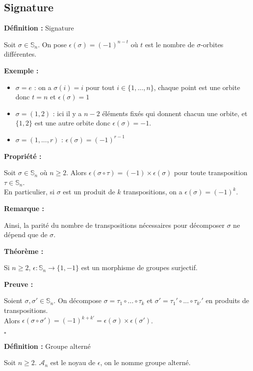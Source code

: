 \documentclass{report}
\renewenvironment{leftbar}{%
  \def\FrameCommand{\vrule width 0.4pt \hspace{10pt}}%
  \MakeFramed {\advance\hsize-\width \FrameRestore}}%
 {\endMakeFramed}%
\newenvironment{definition}[1][]{
    \begin{tcolorbox}[colframe= white]
    \textbf{Définition :} 
    #1 \par
    }
    {\end{tcolorbox}}
\newenvironment{preuve}{\vspace*{0.5cm}
    \begin{leftbar}
    \noindent\textbf{Preuve :}\par}{
    \begin{flushright}
    $\square$
    \end{flushright}
    \end{leftbar}
}
\newenvironment{prop}{\begin{tcolorbox}[colframe= white]
    \textbf{Propriété :}
     \par}
    {\end{tcolorbox}}
\newenvironment{exemple}{\begin{tcolorbox}[colback=gray!10,colframe= white]
    \textbf{Exemple :}
     \par}
    {\end{tcolorbox}}
\newenvironment{theoreme}[1][]{
    \begin{tcolorbox}[]
    \textbf{Théorème :} #1  \par} 
    {\end{tcolorbox}}
\newcommand{\remarque}{
    \noindent\textbf{Remarque :} \par
}
\newcommand{\sn}{\mathbb{S}_n}
\newcommand{\an}{\mathcal{A}_{n}}
\newcommand{\unn}{\{1, ..., n\}}
\newcommand{\sign}{\epsilon(\sigma)}
\begin{document}
\subsection{Signature}
\begin{definition}[Signature]
Soit $\sigma\in\sn$. On pose $\epsilon(\sigma)=(-1)^{n-t}$ où $t$ est le nombre de $\sigma$-orbites différentes.
\end{definition}

\begin{exemple}
\begin{itemize}[label=$\bullet$]
\item $\sigma=e$ : on a $\sigma(i)=i$ pour tout $i\in\unn$, chaque point est une orbite donc $t=n$ et $\sign=1$
\item $\sigma=(1,2)$ : ici il y a $n-2$ éléments fixés qui donnent chacun une orbite, et $\{1,2\}$ est une autre orbite donc $\sign=-1$.
\item $\sigma=(1,...,r)$ : $\sign=(-1)^{r-1}$
\end{itemize}
\end{exemple}

\begin{prop}
Soit $\sigma\in\sn$ où $n\geq2$. Alors $\epsilon(\sigma\circ\tau)=(-1)\times\sign$ pour toute transposition $\tau\in\sn$.\\
En particulier, si $\sigma$ est un produit de $k$ transpositions, on a $\sign=(-1)^k$.
\end{prop}

\remarque{Ainsi, la parité du nombre de transpositions nécessaires pour décomposer $\sigma$ ne dépend que de $\sigma$.}

\begin{theoreme}
Si $n\geq2$, $\epsilon:\sn\longrightarrow\{1,-1\}$ est un morphisme de groupes surjectif.
\end{theoreme}
\begin{preuve}
Soient $\sigma,\sigma'\in\sn$. On décompose $\sigma=\tau_1\circ...\circ\tau_k$ et $\sigma'=\tau_1'\circ...\circ\tau_{k'}'$ en produits de transpositions. \\Alors $\epsilon(\sigma\circ\sigma')=(-1)^{k+k'}=\sign\times\epsilon(\sigma')$.
\end{preuve}

\begin{definition}[Groupe alterné]
Soit $n\geq2$. $\an$ est le noyau de $\epsilon$, on le nomme groupe alterné.
\end{definition}

\par
\par
\end{document}
